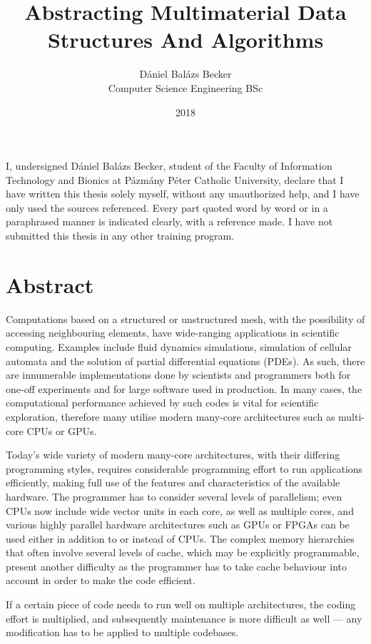 \documentclass[fontsize=11pt, appendixprefix=true]{scrreprt}
\author{Dániel Balázs Becker\\Computer Science Engineering BSc}
\title{Abstracting Multimaterial Data Structures And Algorithms}
\date{2018}
\newcommand{\pushtobottom}{\vspace*{\fill}}
\newcommand{\signatureline}[1]{\begin{flushright}
	\vspace*{.5cm}\par\noindent\makebox[2.5in]{\hrulefill}
	\par\noindent\makebox[2.5in][c]{#1}
	\end{flushright}
}
\begin{document}
\maketitle

\pushtobottom
I, undersigned Dániel Balázs Becker, student of the Faculty of
Information Technology and Bionics at Pázmány Péter Catholic University, declare
that I have written this thesis solely myself, without any unauthorized
help, and I have only used the sources referenced. Every part quoted word by
word or in a paraphrased manner is indicated clearly, with a reference made. I
have not submitted this thesis in any other training program.
\signatureline{Signature}

\tableofcontents
\newpage
\section*{Abstract}
Computations based on a structured or unstructured mesh, with the possibility of
accessing neighbouring elements, have wide-ranging applications in scientific
computing. Examples include fluid dynamics simulations, simulation of cellular
automata and the solution of partial differential equations (PDEs). As such,
there are innumerable implementations done by scientists and programmers both
for one-off experiments and for large software used in production. In many
cases, the computational performance achieved by such codes is vital for
scientific exploration, therefore many utilise modern many-core architectures
such as multi-core CPUs or GPUs.

Today's wide variety of modern many-core architectures, with their differing
programming styles, requires considerable programming effort to run applications
efficiently, making full use of the features and characteristics of the
available hardware. The programmer has to consider several levels of
parallelism; even CPUs now include wide vector units in each core, as well as
multiple cores, and various highly parallel hardware architectures such as GPUs
or FPGAs can be used either in addition to or instead of CPUs. The complex
memory hierarchies that often involve several levels of cache, which may be
explicitly programmable, present another difficulty as the programmer has to
take cache behaviour into account in order to make the code efficient.

If a certain piece of code needs to run well on multiple architectures, the
coding effort is multiplied, and subsequently maintenance is more difficult as
well --- any modification has to be applied to multiple codebases.
\end{document}
